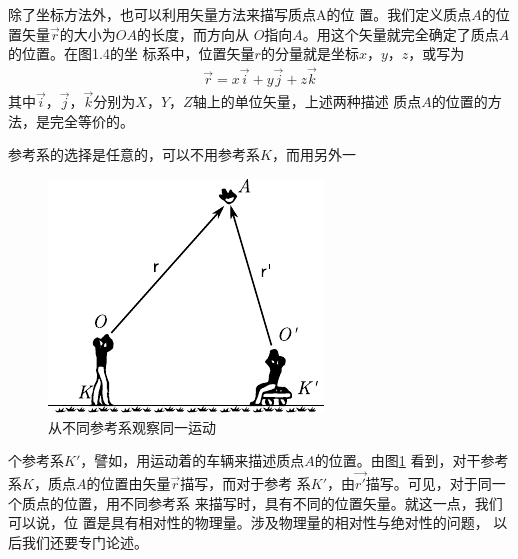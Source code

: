 除了坐标方法外，也可以利用矢量方法来描写质点A的位
置。我们定义质点$A$的位置矢量$\vec{r}$的大小为$OA$的长度，而方向从
$O$指向$A$。用这个矢量就完全确定了质点$A$的位置。在图1.4的坐
标系中，位置矢量$r$的分量就是坐标$x$，$y$，$z$，或写为
\begin{align}\label{eqn:01.04.01}
    \vec{r}=x\vec{i}+y\vec{j}+z\vec{k}
\end{align}
其中$\vec{i}$，$\vec{j}$，$\vec{k}$分别为$X$，$Y$，$Z$轴上的单位矢量，上述两种描述
质点$A$的位置的方法，是完全等价的。

参考系的选择是任意的，可以不用参考系$K$，而用另外一
\begin{figure}
    \includegraphics{figure/fig01.05}
    \caption{从不同参考系观察同一运动}
    \label{fig:01.05}
\end{figure}
个参考系$K'$，譬如，用运动着的车辆来描述质点$A$的位置。由图\ref{fig:01.05}
看到，对干参考系$K$，质点$A$的位置由矢量$\vec{r}$描写，而对于参考
系$K'$，由$\vec{r'}$描写。可见，对于同一个质点的位置，用不同参考系
来描写时，具有不同的位置矢量。就这一点，我们可以说，位
置是具有相对性的物理量。涉及物理量的相对性与绝对性的问题，
以后我们还要专门论述。